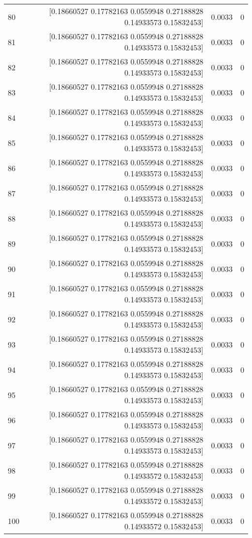 \begin{longtable}{lrrr}
80 & [0.18660527 0.17782163 0.0559948  0.27188828 0.14933573 0.15832453] & 0.0033 & 0 \\
81 & [0.18660527 0.17782163 0.0559948  0.27188828 0.14933573 0.15832453] & 0.0033 & 0 \\
82 & [0.18660527 0.17782163 0.0559948  0.27188828 0.14933573 0.15832453] & 0.0033 & 0 \\
83 & [0.18660527 0.17782163 0.0559948  0.27188828 0.14933573 0.15832453] & 0.0033 & 0 \\
84 & [0.18660527 0.17782163 0.0559948  0.27188828 0.14933573 0.15832453] & 0.0033 & 0 \\
85 & [0.18660527 0.17782163 0.0559948  0.27188828 0.14933573 0.15832453] & 0.0033 & 0 \\
86 & [0.18660527 0.17782163 0.0559948  0.27188828 0.14933573 0.15832453] & 0.0033 & 0 \\
87 & [0.18660527 0.17782163 0.0559948  0.27188828 0.14933573 0.15832453] & 0.0033 & 0 \\
88 & [0.18660527 0.17782163 0.0559948  0.27188828 0.14933573 0.15832453] & 0.0033 & 0 \\
89 & [0.18660527 0.17782163 0.0559948  0.27188828 0.14933573 0.15832453] & 0.0033 & 0 \\
90 & [0.18660527 0.17782163 0.0559948  0.27188828 0.14933573 0.15832453] & 0.0033 & 0 \\
91 & [0.18660527 0.17782163 0.0559948  0.27188828 0.14933573 0.15832453] & 0.0033 & 0 \\
92 & [0.18660527 0.17782163 0.0559948  0.27188828 0.14933573 0.15832453] & 0.0033 & 0 \\
93 & [0.18660527 0.17782163 0.0559948  0.27188828 0.14933573 0.15832453] & 0.0033 & 0 \\
94 & [0.18660527 0.17782163 0.0559948  0.27188828 0.14933573 0.15832453] & 0.0033 & 0 \\
95 & [0.18660527 0.17782163 0.0559948  0.27188828 0.14933573 0.15832453] & 0.0033 & 0 \\
96 & [0.18660527 0.17782163 0.0559948  0.27188828 0.14933573 0.15832453] & 0.0033 & 0 \\
97 & [0.18660527 0.17782163 0.0559948  0.27188828 0.14933573 0.15832453] & 0.0033 & 0 \\
98 & [0.18660527 0.17782163 0.0559948  0.27188828 0.14933572 0.15832453] & 0.0033 & 0 \\
99 & [0.18660527 0.17782163 0.0559948  0.27188828 0.14933572 0.15832453] & 0.0033 & 0 \\
100 & [0.18660527 0.17782163 0.0559948  0.27188828 0.14933572 0.15832453] & 0.0033 & 0 \\

\end{longtable}
